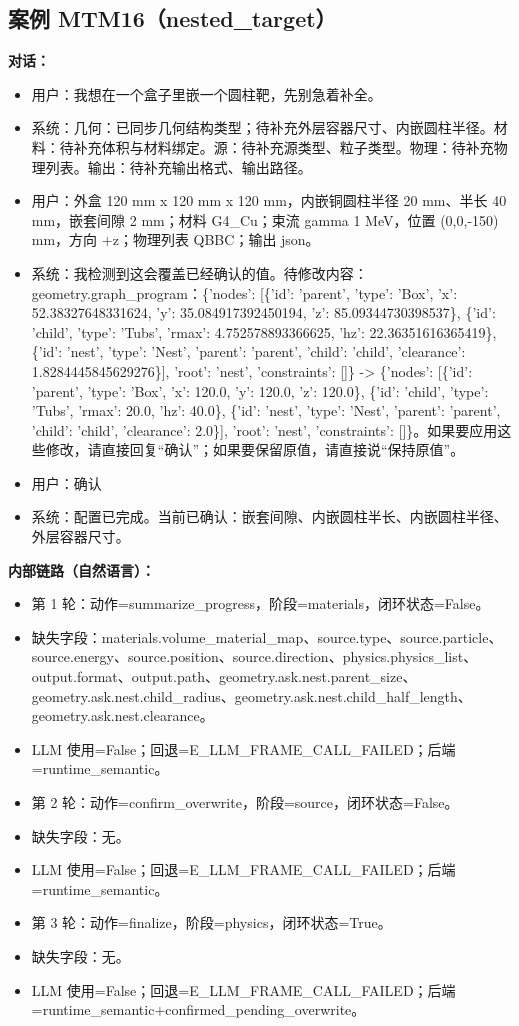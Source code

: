\documentclass[11pt]{ctexart}
\begin{document}
\subsection{案例 MTM16（nested\_target）}
\textbf{对话：}
\begin{itemize}
\item 用户：我想在一个盒子里嵌一个圆柱靶，先别急着补全。
\item 系统：几何：已同步几何结构类型；待补充外层容器尺寸、内嵌圆柱半径。材料：待补充体积与材料绑定。源：待补充源类型、粒子类型。物理：待补充物理列表。输出：待补充输出格式、输出路径。
\item 用户：外盒 120 mm x 120 mm x 120 mm，内嵌铜圆柱半径 20 mm、半长 40 mm，嵌套间隙 2 mm；材料 G4\_Cu；束流 gamma 1 MeV，位置 (0,0,-150) mm，方向 +z；物理列表 QBBC；输出 json。
\item 系统：我检测到这会覆盖已经确认的值。待修改内容：geometry.graph\_program：\{'nodes': [\{'id': 'parent', 'type': 'Box', 'x': 52.38327648331624, 'y': 35.084917392450194, 'z': 85.09344730398537\}, \{'id': 'child', 'type': 'Tubs', 'rmax': 4.752578893366625, 'hz': 22.36351616365419\}, \{'id': 'nest', 'type': 'Nest', 'parent': 'parent', 'child': 'child', 'clearance': 1.8284445845629276\}], 'root': 'nest', 'constraints': []\} -> \{'nodes': [\{'id': 'parent', 'type': 'Box', 'x': 120.0, 'y': 120.0, 'z': 120.0\}, \{'id': 'child', 'type': 'Tubs', 'rmax': 20.0, 'hz': 40.0\}, \{'id': 'nest', 'type': 'Nest', 'parent': 'parent', 'child': 'child', 'clearance': 2.0\}], 'root': 'nest', 'constraints': []\}。如果要应用这些修改，请直接回复“确认”；如果要保留原值，请直接说“保持原值”。
\item 用户：确认
\item 系统：配置已完成。当前已确认：嵌套间隙、内嵌圆柱半长、内嵌圆柱半径、外层容器尺寸。
\end{itemize}
\textbf{内部链路（自然语言）：}
\begin{itemize}
\item 第 1 轮：动作=summarize\_progress，阶段=materials，闭环状态=False。
\item 缺失字段：materials.volume\_material\_map、source.type、source.particle、source.energy、source.position、source.direction、physics.physics\_list、output.format、output.path、geometry.ask.nest.parent\_size、geometry.ask.nest.child\_radius、geometry.ask.nest.child\_half\_length、geometry.ask.nest.clearance。
\item LLM 使用=False；回退=E\_LLM\_FRAME\_CALL\_FAILED；后端=runtime\_semantic。
\item 第 2 轮：动作=confirm\_overwrite，阶段=source，闭环状态=False。
\item 缺失字段：无。
\item LLM 使用=False；回退=E\_LLM\_FRAME\_CALL\_FAILED；后端=runtime\_semantic。
\item 第 3 轮：动作=finalize，阶段=physics，闭环状态=True。
\item 缺失字段：无。
\item LLM 使用=False；回退=E\_LLM\_FRAME\_CALL\_FAILED；后端=runtime\_semantic+confirmed\_pending\_overwrite。
\end{itemize}
\end{document}

